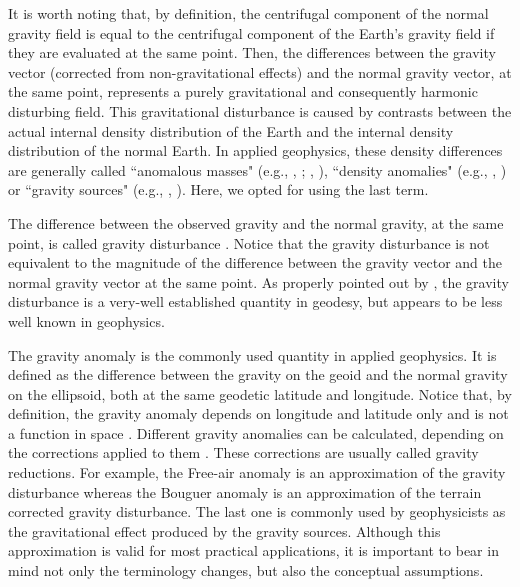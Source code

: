 \documentclass[extra]{gji}
\begin{document}
It is worth noting that, by definition, 
the centrifugal component of the normal gravity field is
equal to the centrifugal component of the Earth's gravity
field if they are evaluated at the same point.
Then, the differences between the gravity vector
(corrected from non-gravitational effects) 
and the normal gravity vector, at the same point, represents a purely 
gravitational and consequently harmonic disturbing field.
This gravitational disturbance 
is caused by contrasts between the actual internal 
density distribution of the Earth and the internal density 
distribution of the normal Earth.
In applied geophysics, these density differences are generally 
called ``anomalous masses" (e.g., \citeauthor{hammer1945}, 
\citeyear{hammer1945}; \citeauthor{lafehr1965}, \citeyear{lafehr1965}),
``density anomalies" (e.g., \citeauthor{forsberg1984}, \citeyear{forsberg1984})
or ``gravity sources" (e.g., \citeauthor{blakely1996}, 
\citeyear{blakely1996}). Here, we opted for using the last term.

The difference between the observed gravity and the
normal gravity, at the same point, is called gravity disturbance
\citep{hofmann-wellenhof-moritz2005}.
Notice that the gravity disturbance is not equivalent to the
magnitude of the difference between the gravity vector
and the normal gravity vector at the same point.
As properly pointed out by \citet{hackney-featherstone2003},
the gravity disturbance is a very-well established quantity in geodesy,
but appears to be less well known in geophysics.

The gravity anomaly is the commonly used quantity in applied 
geophysics. It is defined as the difference
between the gravity on the geoid and the normal gravity on the ellipsoid,
both at the same geodetic latitude and longitude.
Notice that, by definition, the gravity anomaly depends on 
longitude and latitude only and is not a function in space 
\citep{barthelmes2013}.
Different gravity anomalies can be calculated, depending on the
corrections applied to them \citep{blakely1996, hofmann-wellenhof-moritz2005}.
These corrections are usually called gravity reductions.
For example, the Free-air anomaly is an approximation of the
gravity disturbance whereas the Bouguer anomaly
is an approximation of the terrain corrected gravity disturbance.
The last one is commonly used by geophysicists as the
gravitational effect produced by the gravity sources.
Although this approximation is valid for most practical applications,
it is important to bear in mind not only the terminology 
changes, but also the conceptual assumptions.
\end{document}

